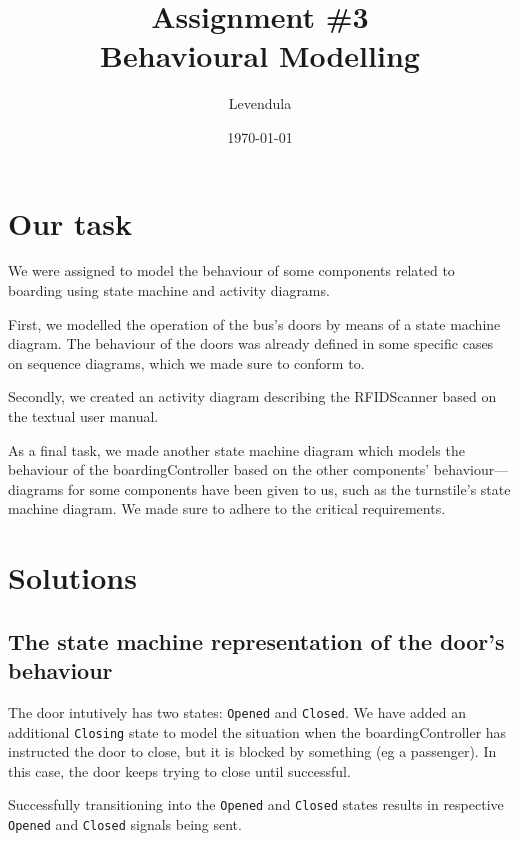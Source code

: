 \documentclass[a4paper]{article}
\title{Assignment \#3 \\ Behavioural Modelling}
\author{Levendula}
\date{\today}
\begin{document}


\tableofcontents
\listoffigures
\clearpage



\section{Our task}

We were assigned to model the behaviour of some components related to boarding
using state machine and activity diagrams.

First, we modelled the operation of the bus's doors by means of a state machine
diagram. The behaviour of the doors was already defined in some specific cases
on sequence diagrams, which we made sure to conform to.

Secondly, we created an activity diagram describing the \gls{RFIDScanner} based
on the textual user manual.

As a final task, we made another state machine diagram which models the
behaviour of the \gls{boardingController} based on the other components'
behaviour—diagrams for some components have been given to us, such as the
\gls{turnstile}'s state machine diagram. We made sure to adhere to the critical
requirements.


\section{Solutions}


\subsection{The state machine representation of the door's behaviour}

The door intutively has two states: \texttt{Opened} and \texttt{Closed}. We have
added an additional \texttt{Closing} state to model the situation when the
\gls{boardingController} has instructed the door to close, but it is blocked by
something (eg a passenger). In this case, the door keeps trying to close until
successful.

Successfully transitioning into the \texttt{Opened} and \texttt{Closed} states
results in respective \texttt{Opened} and \texttt{Closed} signals being sent.
\end{document}
